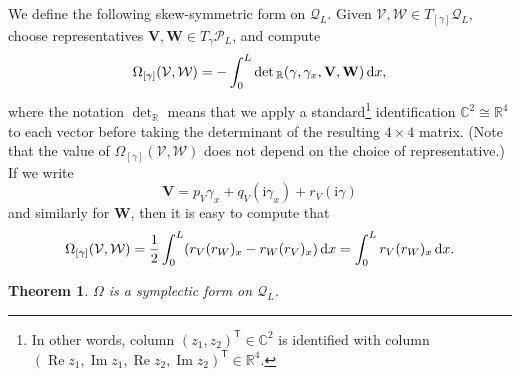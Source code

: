 \documentclass[10pt,a4paper]{amsart}
\newcommand\Leg{ {\mathcal P}} %
\newcommand\Legq{\mathcal Q}
\def\ri{\mathrm{i}}
\newcommand\VV{\mathbf V}
\newcommand\VW{\mathbf W}
\newcommand\qV{\mathcal V}%
\newcommand\qW{\mathcal W}
\newcommand{\dx}{\,{\rm d}x}
\def\gam{\gamma} %
\def\C{\mathbb C}
\def\R{\mathbb R}
\renewcommand\Re{\operatorname{Re}}
\renewcommand\Im{\operatorname{Im}}
\numberwithin{equation}{section}
\newtheorem{Theorem}{Theorem}[section]
\begin{document}
We define the following skew-symmetric form on $\Legq_L$. Given $\qV, \qW \in T_{[\gamma]}\Legq_L$, choose
representatives $\VV,\VW \in T_\gamma \Leg_L$, and compute
\begin{equation}\label{our2form}
\Omega_{[\gamma]} (\qV, \qW)
= -\int_0^L \det{}_\R( \gam, \gam_x, \VV, \VW)\dx,
\end{equation}
where the notation $\det_\R$ means that we apply a standard\footnote{%
In other words, column $(z_1, z_2)^{\mathsf{T}} \in \C^2$ is identified with column $(\Re z_1, \Im z_1, \Re z_2, \Im z_2)^{\mathsf{T}}\in \R^4$.}
identification $\C^2 \cong \R^4$ to each vector before taking the determinant of the resulting $4\times 4$ matrix.
(Note that the value of $\Omega_{[\gamma]}(\qV, \qW)$
does not depend on the choice of representative.)
If we write
\[\VV = p_V\gam_x + q_V (\ri\gam_x) + r_V (\ri \gam)\]
and similarly for $\VW$, then it is easy to compute that
\[\Omega_{[\gamma]}(\qV, \qW) = \frac12\int_0^L (r_V (r_W)_x - r_W (r_V)_x) \dx = \int_0^L r_V (r_W)_x \dx.\]



\begin{Theorem} $\Omega$ is a symplectic form on $\Legq_L$.
\end{Theorem}
\end{document}
